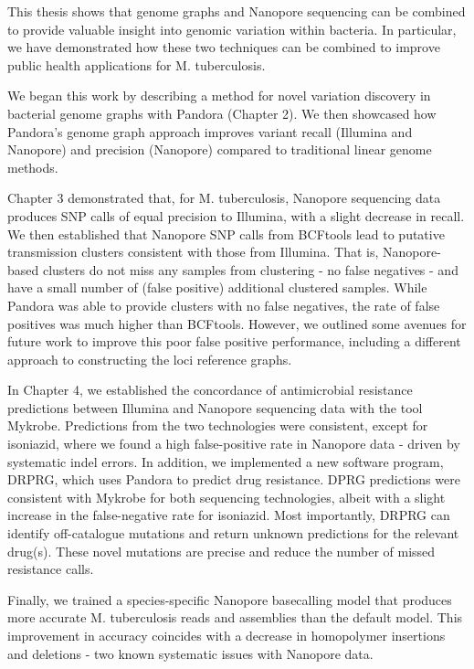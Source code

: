 


This thesis shows that genome graphs and Nanopore sequencing can be combined to provide valuable insight into genomic variation within bacteria. In particular, we have demonstrated how these two techniques can be combined to improve public health applications for M. tuberculosis.

We began this work by describing a method for novel variation discovery in bacterial genome graphs with Pandora (Chapter 2). We then showcased how Pandora's genome graph approach improves variant recall (Illumina and Nanopore) and precision (Nanopore) compared to traditional linear genome methods.

Chapter 3 demonstrated that, for M. tuberculosis, Nanopore sequencing data produces SNP calls of equal precision to Illumina, with a slight decrease in recall. We then established that Nanopore SNP calls from BCFtools lead to putative transmission clusters consistent with those from Illumina. That is, Nanopore-based clusters do not miss any samples from clustering - no false negatives - and have a small number of (false positive) additional clustered samples. While Pandora was able to provide clusters with no false negatives, the rate of false positives was much higher than BCFtools. However, we outlined some avenues for future work to improve this poor false positive performance, including a different approach to constructing the loci reference graphs. 

In Chapter 4, we established the concordance of antimicrobial resistance predictions between Illumina and Nanopore sequencing data with the tool Mykrobe. Predictions from the two technologies were consistent, except for isoniazid, where we found a high false-positive rate in Nanopore data - driven by systematic indel errors. In addition, we implemented a new software program, DRPRG, which uses Pandora to predict drug resistance. DPRG predictions were consistent with Mykrobe for both sequencing technologies, albeit with a slight increase in the false-negative rate for isoniazid. Most importantly, DRPRG can identify off-catalogue mutations and return unknown predictions for the relevant drug(s). These novel mutations are precise and reduce the number of missed resistance calls.

Finally, we trained a species-specific Nanopore basecalling model that produces more accurate M. tuberculosis reads and assemblies than the default model. This improvement in accuracy coincides with a decrease in homopolymer insertions and deletions - two known systematic issues with Nanopore data.